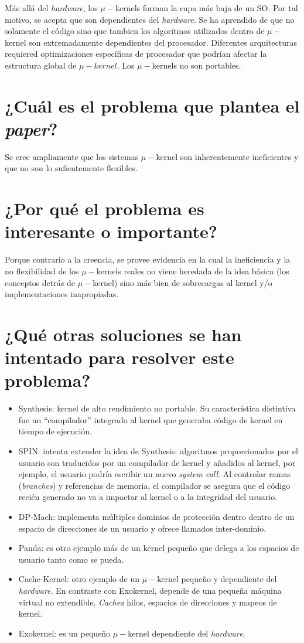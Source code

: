 Más allá del \textit{hardware}, los $\mu-$kernels forman la capa más baja de un SO. Por tal motivo, se acepta que son dependientes del \textit{hardware}. Se ha aprendido de que no solamente el código sino que tambien los algoritmos utilizados dentro de $\mu-$kernel son extremadamente dependientes del procesador. Diferentes arquitecturas requiered optimizaciones específicas de procesador que podrían afectar la estructura global de $\mu-kernel$. Los $\mu-$kernels no son portables.


\section{¿Cuál es el problema que plantea el \textit{paper}?}
Se cree ampliamente que los sistemas $\mu-$kernel son inherentemente ineficientes y que no son lo sufientemente flexibles. 

\section{¿Por qué el problema es interesante o importante?}
Porque contrario a la creencia, se provee evidencia en la cual la ineficiencia y la no flexibilidad de los $\mu-$kernels reales no viene heredada de la idea básica (los conceptos detrás de $\mu-$kernel) sino más bien de sobrecargas al kernel y/o implementaciones inapropiadas.

\section{¿Qué otras soluciones se han intentado para resolver este problema?}
\begin{itemize}
    \item Synthesis: kernel de alto rendimiento no portable. Su característica distintiva fue un ``compilador'' integrado al kernel que generaba código de kernel en tiempo de ejecución.
    \item SPIN: intenta extender la idea de Synthesis: algoritmos proporcionados por el usuario son traducidos por un compilador de kernel y añadidos al kernel, por ejemplo, el usuario podría escribir un nuevo \textit{system call}. Al controlar ramas (\textit{branches}) y referencias de memoria, el compilador se asegura que el código recién generado no va a impactar al kernel o a la integridad del usuario.
    \item DP-Mach: implementa múltiples dominios de protección dentro dentro de un espacio de direcciones de un usuario y ofrece llamados inter-dominio.
    \item Panda: es otro ejemplo más de un kernel pequeño que delega a los espacios de usuario tanto como se pueda.
    \item Cache-Kernel: otro ejemplo de un $\mu-$kernel pequeño y dependiente del \textit{hardware}. En contraste con Exokernel, depende de una pequeña máquina virtual no extendible. \textit{Cachea} hilos, espacios de direcciones y mapeos de kernel.
    \item Exokernel: es un pequeño $\mu-$kernel dependiente del \textit{hardware}.
\end{itemize}

